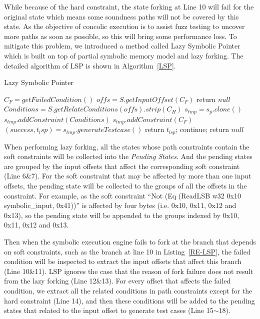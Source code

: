 

While because of the hard constraint, the state forking at Line 10 will fail for the original state which means some soundness paths will not be covered by this state. As the objective of concolic execution is to assist fuzz testing to uncover more paths as soon as possible, so this will bring some performance loss. To mitigate this problem, we introduced a method called Lazy Symbolic Pointer which is built on top of partial symbolic memory model and lazy forking. The detailed algorithm of LSP is shown in Algorithm~\ref{LSP}.
\begin{algorithm} [htpd]
  \caption{Lazy Symbolic Pointer}
  \label{LSP}
  $C_F = getFailedCondition()$\;
  $offs = S.getInputOffset(C_F)$\;
  {
    return $null$\;
  }
  $Conditions = S.getRelateConditions(offs).strip(C_H)$\;
  {
    $s_{tmp} = s_p.clone()$\;
    $s_{tmp}.addConstraint(Conditions)$\;
    $s_{tmp}.addConstraint(C_F)$\;
    $(success, t_lsp) = s_{tmp}.generateTestcase()$\;
    {
      return $t_{lsp}$;
    } {
      continue;
    }
  }
  return $null$\;
\end{algorithm}  

When performing lazy forking, all the states whose path constraints contain the soft constraints will be collected into the \emph{Pending States}. And the pending states are grouped by the input offsets that affect the corresponding soft constraint (Line 6\&7). For the soft constraint that may be affected by more than one input offsets, the pending state will be collected to the groups of all the offsets in the constraint. For example, as the soft constraint ``Not (Eq (ReadLSB w32 0x10 symbolic\_input, 0x41))'' is affected by four bytes (i.e. 0x10, 0x11, 0x12 and 0x13), so the pending state will be appended to the groups indexed by 0x10, 0x11, 0x12 and 0x13. 

Then when the symbolic execution engine fails to fork at the branch that depends on soft constraints, such as the branch at line 10 in Listing~\ref{RE-LSP}, the failed condition will be inspected to extract the input offsets that affect this branch (Line 10\&11). LSP ignores the case that the reason of fork failure does not result from the lazy forking (Line 12\&13). For every offset that affects the failed condition, we extract all the related conditions in path constraints except for the hard constraint (Line 14), and then these conditions will be added to the pending states that related to the input offset to generate test cases (Line 15$\sim$18). 

